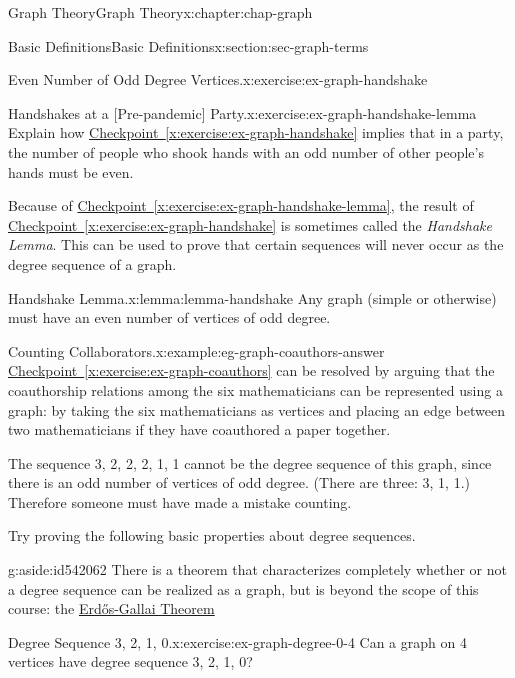 \documentclass[oneside,10pt,]{book}
\newcommand{\xreffont}{\relax}
\numberwithin{equation}{section}
\begin{document}
\begin{chapterptx}{Graph Theory}{}{Graph Theory}{}{}{x:chapter:chap-graph}
\begin{sectionptx}{Basic Definitions}{}{Basic Definitions}{}{}{x:section:sec-graph-terms}
\begin{inlineexercise}{Even Number of Odd Degree Vertices.}{x:exercise:ex-graph-handshake}
\end{inlineexercise}%
\begin{inlineexercise}{Handshakes at a [Pre-pandemic] Party.}{x:exercise:ex-graph-handshake-lemma}%
Explain how \hyperref[x:exercise:ex-graph-handshake]{Checkpoint~{\xreffont\ref{x:exercise:ex-graph-handshake}}} implies that in a party, the number of people who shook hands with an odd number of other people's hands must be even.%
\end{inlineexercise}%
Because of \hyperref[x:exercise:ex-graph-handshake-lemma]{Checkpoint~{\xreffont\ref{x:exercise:ex-graph-handshake-lemma}}}, the result of \hyperref[x:exercise:ex-graph-handshake]{Checkpoint~{\xreffont\ref{x:exercise:ex-graph-handshake}}} is sometimes called the \emph{Handshake Lemma}. This can be used to prove that certain sequences will never occur as the degree sequence of a graph.%
\begin{lemma}{Handshake Lemma.}{}{x:lemma:lemma-handshake}%
Any graph (simple or otherwise) must have an even number of vertices of odd degree.%
\end{lemma}
\begin{example}{Counting Collaborators.}{x:example:eg-graph-coauthors-answer}%
\hyperref[x:exercise:ex-graph-coauthors]{Checkpoint~{\xreffont\ref{x:exercise:ex-graph-coauthors}}} can be resolved by arguing that the coauthorship relations among the six mathematicians can be represented using a graph: by taking the six mathematicians as vertices and placing an edge between two mathematicians if they have coauthored a paper together.%
\par
The sequence 3, 2, 2, 2, 1, 1 cannot be the degree sequence of this graph, since there is an odd number of vertices of odd degree. (There are three: 3, 1, 1.) Therefore someone must have made a mistake counting.%
\end{example}
Try proving the following basic properties about degree sequences.%
\begin{aside}{}{g:aside:id542062}%
There is a theorem that characterizes completely whether or not a degree sequence can be realized as a graph, but is beyond the scope of this course: the \href{https://en.wikipedia.org/wiki/Erd\%C5\%91s\%E2\%80\%93Gallai_theorem}{Erdős-Gallai Theorem}%
\end{aside}
\begin{inlineexercise}{Degree Sequence 3, 2, 1, 0.}{x:exercise:ex-graph-degree-0-4}%
Can a graph on 4 vertices have degree sequence 3, 2, 1, 0?%
\end{inlineexercise}%

\end{sectionptx}
\end{chapterptx}
\end{document}
